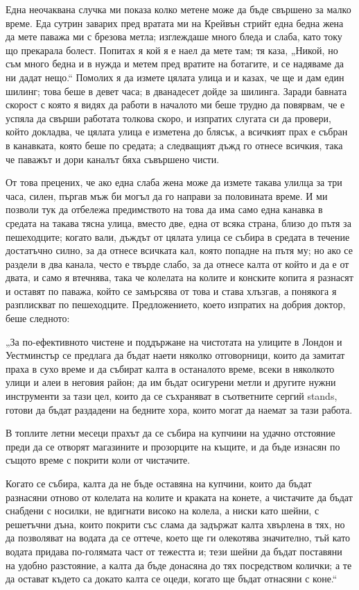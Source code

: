 \documentclass[12pt]{book}
\begin{document}
Една неочаквана случка ми показа колко метене може да бъде свършено за малко време. Еда сутрин заварих пред вратата ми на Крейвън стрийт една бедна жена да мете паважа ми с брезова метла; изглеждаше много бледа и слаба, като току що прекарала болест. Попитах я кой я е наел да мете там; тя каза, „Никой, но съм много бедна и в нужда и метем пред вратите на ботагите, и се надяваме да ни дадат нещо.“ Помолих я да измете цялата улица и и казах, че ще и дам един шилинг; това беше в девет часа; в дванадесет дойде за шилинга. Заради бавната скорост с която я видях да работи в началото ми беше трудно да повярвам, че е успяла да свърши работата толкова скоро, и изпратих слугата си да провери, който докладва, че цялата улица е изметена до блясък, а всичкият прах е събран в канавката, която беше по средата; а следващият дъжд го отнесе всичкия, така че паважът и дори каналът бяха съвършено чисти. 

От това прецених, че ако една слаба жена може да измете такава улилца за три часа, силен, пъргав мъж би могъл да го направи за половината време. И ми позволи тук да отбележа предимството на това да има само една канавка в средата на такава тясна улица, вместо две, една от всяка страна, близо до пътя за пешеходците; когато вали, дъждът от цялата улица се събира в средата в течение достатъчно силно, за да отнесе всичката кал, която попадне на пътя му; но ако се раздели в два канала, често е твърде слабо, за да отнесе калта от който и да е от двата, и само я втечнява, така че колелата на колите и конските копита я разнасят и оставят по паважа, който се замърсява от това и става хлъзгав, а понякога я разплискват по пешеходците. Предложението, което изпратих на добрия доктор, беше следното:

„За по-ефективното чистене и поддържане на чистотата на улиците в Лондон и Уестминстър се предлага да бъдат наети няколко отговорници, които да замитат праха в сухо време и да събират калта в останалото време, всеки в няколкото улици и алеи в неговия район; да им бъдат осигурени метли и другите нужни инструменти за тази цел, които да се съхраняват в съответните сергий stands, готови да бъдат раздадени на бедните хора, които могат да наемат за тази работа. 

В топлите летни месеци прахът да се събира на купчини на удачно отстояние преди да се отворят магазините и прозорците на къщите, и да бъде изнасян по същото време с покрити коли от чистачите. 

Когато се събира, калта да не бъде оставяна на купчини, които да бъдат разнасяни отново от колелата на колите и краката на конете, а чистачите да бъдат снабдени с носилки, не вдигнати високо на колела, а ниски като шейни, с решетъчни дъна, които покрити със слама да задържат калта хвърлена в тях, но да позволяват на водата да се оттече, което ще ги олекотява значително, тъй като водата придава по-голямата част от тежестта и; тези шейни да бъдат поставяни на удобно разстояние, а калта да бъде донасяна до тях посредством колички; а те да остават където са докато калта се оцеди, когато ще бъдат отнасяни с коне.“
\end{document}
